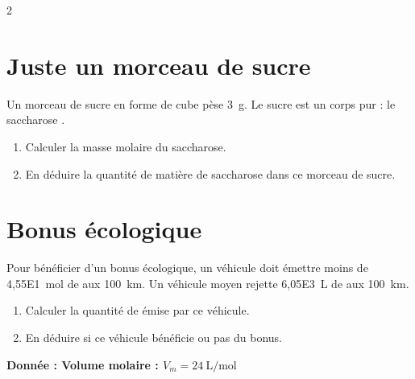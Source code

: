 \documentclass[a4paper,11pt,fleqn]{article}%
\begin{document}
	\maketitle
	
	\begin{multicols}{2}
\section{Juste un morceau de sucre}
Un morceau de sucre en forme de cube pèse \SI{3}{g}. Le sucre est un corps pur : le saccharose .
\begin{enumerate}
	\item Calculer la masse molaire du saccharose.
	\item En déduire la quantité de matière de saccharose dans ce morceau de sucre.
\end{enumerate}

\section{Bonus écologique}
Pour bénéficier d'un bonus écologique, un véhicule doit émettre moins de \SI{4,55E1}{\mole} de  aux \SI{100}{km}. Un véhicule moyen rejette \SI{6,05E3}{L} de  aux \SI{100}{km}.
\begin{enumerate}
	\item Calculer la quantité de  émise par ce véhicule.
	\item En déduire si ce véhicule bénéficie ou pas du bonus.
\end{enumerate}
\textbf{Donnée : Volume molaire : $V_m = \SI{24}{\liter\per\mole}$}


\end{multicols}
\end{document}
